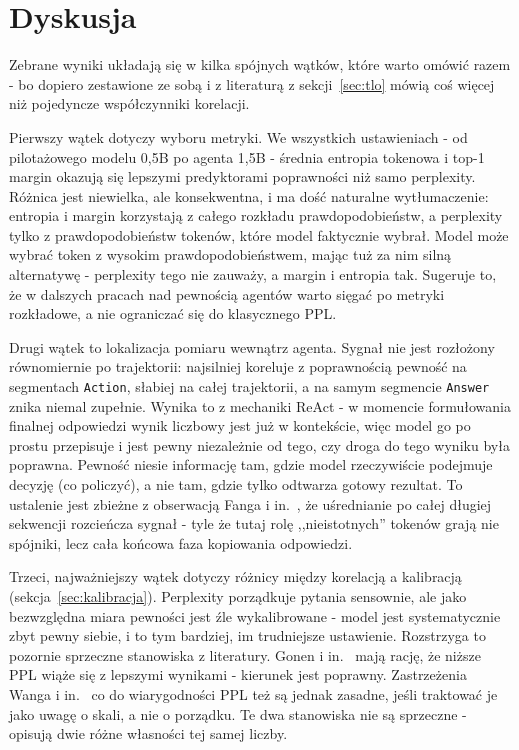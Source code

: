 
\section{Dyskusja}
\label{sec:dyskusja}

Zebrane wyniki układają się w kilka spójnych wątków, które warto
omówić razem - bo dopiero zestawione ze sobą i z literaturą z
sekcji~\ref{sec:tlo} mówią coś więcej niż pojedyncze współczynniki
korelacji.

Pierwszy wątek dotyczy wyboru metryki. We wszystkich ustawieniach -
od pilotażowego modelu 0,5B po agenta 1,5B - średnia entropia
tokenowa i top-1 margin okazują się lepszymi predyktorami
poprawności niż samo perplexity. Różnica jest niewielka, ale
konsekwentna, i ma dość naturalne wytłumaczenie: entropia i margin
korzystają z całego rozkładu prawdopodobieństw, a perplexity tylko
z prawdopodobieństw tokenów, które model faktycznie wybrał. Model
może wybrać token z wysokim prawdopodobieństwem, mając tuż za nim
silną alternatywę - perplexity tego nie zauważy, a margin i entropia
tak. Sugeruje to, że w dalszych pracach nad pewnością agentów warto
sięgać po metryki rozkładowe, a nie ograniczać się do klasycznego PPL.

Drugi wątek to lokalizacja pomiaru wewnątrz agenta. Sygnał nie jest
rozłożony równomiernie po trajektorii: najsilniej koreluje z
poprawnością pewność na segmentach \texttt{Action}, słabiej na całej
trajektorii, a na samym segmencie \texttt{Answer} znika niemal
zupełnie. Wynika to z mechaniki ReAct - w momencie formułowania
finalnej odpowiedzi wynik liczbowy jest już w kontekście, więc model
go po prostu przepisuje i jest pewny niezależnie od tego, czy droga
do tego wyniku była poprawna. Pewność niesie informację tam, gdzie
model rzeczywiście podejmuje decyzję (co policzyć), a nie tam, gdzie
tylko odtwarza gotowy rezultat. To ustalenie jest zbieżne z
obserwacją Fanga i in.~\cite{fang2025longppl}, że uśrednianie po
całej długiej sekwencji rozcieńcza sygnał - tyle że tutaj rolę
,,nieistotnych'' tokenów grają nie spójniki, lecz cała końcowa
faza kopiowania odpowiedzi.

Trzeci, najważniejszy wątek dotyczy różnicy między korelacją a
kalibracją (sekcja~\ref{sec:kalibracja}). Perplexity porządkuje
pytania sensownie, ale jako bezwzględna miara pewności jest źle
wykalibrowane - model jest systematycznie zbyt pewny siebie, i to
tym bardziej, im trudniejsze ustawienie. Rozstrzyga to pozornie
sprzeczne stanowiska z literatury. Gonen i
in.~\cite{gonen2023demystifying} mają rację, że niższe PPL wiąże się
z lepszymi wynikami - kierunek jest poprawny. Zastrzeżenia Wanga i
in.~\cite{wang2022perplexity} co do wiarygodności PPL też są jednak
zasadne, jeśli traktować je jako uwagę o skali, a nie o porządku.
Te dwa stanowiska nie są sprzeczne - opisują dwie różne własności
tej samej liczby.

